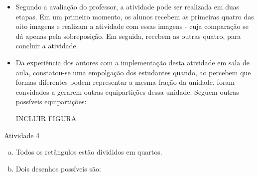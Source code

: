 \begin{multicols}{2}
\noindent {}
\begin{itemize} %
\item Segundo a avaliação do professor, a atividade pode ser realizada em duas etapas. Em um primeiro momento, os alunos recebem as primeiras quatro das oito imagens e realizam a atividade com essas imagens - cuja comparação se dá apenas pela sobreposição. Em seguida, recebem as outras quatro, para concluir a atividade. 

\item Da experiência dos autores com a implementação desta atividade em sala de aula, constatou-se uma empolgação dos estudantes quando, ao percebem que formas diferentes podem representar a mesma fração da unidade, foram convidados a gerarem outras equipartições dessa unidade. Seguem outras possíveis equipartições:

  INCLUIR FIGURA
\end{itemize} %


\begin{resposta*}{Atividade 4}
\begin{enumerate}[a),wide,labelindent=0pt] %
    \item       Todos os retângulos estão divididos em quartos.
    \item       Dois desenhos possíveis são:

\end{enumerate} %
\end{resposta*}

\Bg
\end{multicols}
